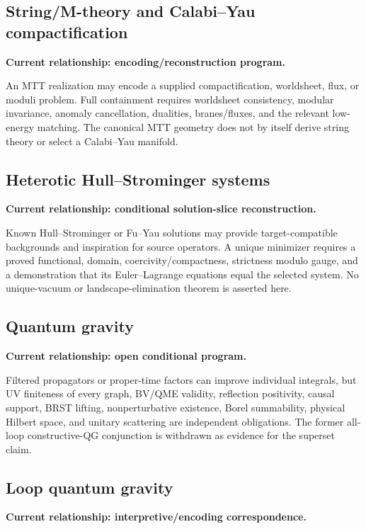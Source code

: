 \documentclass[11pt]{article}
\begin{document}
\subsection{String/M-theory and Calabi--Yau compactification}

\textbf{Current relationship: encoding/reconstruction program.}

An MTT realization may encode a supplied compactification, worldsheet, flux,
or moduli problem. Full containment requires worldsheet consistency, modular
invariance, anomaly cancellation, dualities, branes/fluxes, and the relevant
low-energy matching. The canonical MTT geometry does not by itself derive
string theory or select a Calabi--Yau manifold.

\subsection{Heterotic Hull--Strominger systems}

\textbf{Current relationship: conditional solution-slice reconstruction.}

Known Hull--Strominger or Fu--Yau solutions may provide target-compatible
backgrounds and inspiration for source operators. A unique minimizer requires
a proved functional, domain, coercivity/compactness, strictness modulo gauge,
and a demonstration that its Euler--Lagrange equations equal the selected
system. No unique-vacuum or landscape-elimination theorem is asserted here.

\subsection{Quantum gravity}

\textbf{Current relationship: open conditional program.}

Filtered propagators or proper-time factors can improve individual integrals,
but UV finiteness of every graph, BV/QME validity, reflection positivity,
causal support, BRST lifting, nonperturbative existence, Borel summability,
physical Hilbert space, and unitary scattering are independent obligations.
The former all-loop constructive-QG conjunction is withdrawn as evidence for
the superset claim.

\subsection{Loop quantum gravity}

\textbf{Current relationship: interpretive/encoding correspondence.}
\end{document}
